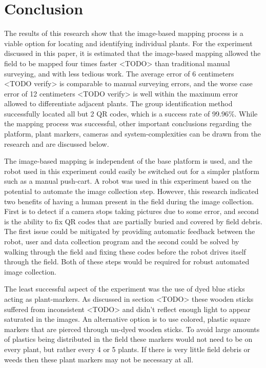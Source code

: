 
\cleardoublepage

\chapter{Conclusion}
\label{conclusion}

The results of this research show that the image-based mapping process is a viable option for locating and identifying individual plants.  For the experiment discussed in this paper, it is estimated that the image-based mapping allowed the field to be mapped four times faster <TODO> than traditional manual surveying, and with less tedious work.  The average error of 6 centimeters <TODO verify> is comparable to manual surveying errors, and the worse case error of 12 centimeters <TODO verify> is well within the maximum error allowed to differentiate adjacent plants.  The group identification method successfully located all but 2 QR codes, which is a success rate of 99.96\%.  While the mapping process was successful, other important conclusions regarding the platform, plant markers, cameras and system-complexities can be drawn from the research and are discussed below.

The image-based mapping is independent of the base platform is used, and the robot used in this experiment could easily be switched out for a simpler platform such as a manual push-cart.  A robot was used in this experiment based on the potential to automate the image collection step.  However, this research indicated two benefits of having a human present in the field during the image collection.  First is to detect if a camera stops taking pictures due to some error, and second is the ability to fix QR codes that are partially buried and covered by field debris.  The first issue could be mitigated by providing automatic feedback between the robot, user and data collection program and the second could be solved by walking through the field and fixing these codes before the robot drives itself through the field.  Both of these steps would be required for robust automated image collection.       

The least successful aspect of the experiment was the use of dyed blue sticks acting as plant-markers.  As discussed in section <TODO> these wooden sticks suffered from inconsistent <TODO> and didn't reflect enough light to appear saturated in the images.  An alternative option is to use colored, plastic square markers that are pierced through un-dyed wooden sticks.  To avoid large amounts of plastics being distributed in the field these markers would not need to be on every plant, but rather every 4 or 5 plants.  If there is very little field debris or weeds then these plant markers may not be necessary at all. 

